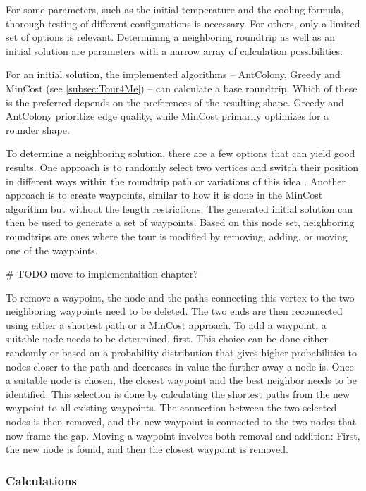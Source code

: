 For some parameters, such as the initial temperature and the cooling formula, thorough testing of different configurations is necessary.
For others, only a limited set of options is relevant.
Determining a neighboring roundtrip as well as an initial solution are parameters with a narrow array of calculation possibilities:

For an initial solution, the implemented algorithms -- AntColony, Greedy and MinCost (see \ref{subsec:Tour4Me}) -- can calculate a base roundtrip.
Which of these is the preferred depends on the preferences of the resulting shape. 
Greedy and AntColony prioritize edge quality, while MinCost primarily optimizes for a rounder shape.

To determine a neighboring solution, there are a few options that can yield good results.
One approach is to randomly select two vertices and switch their position in different ways within the roundtrip path or variations of this idea \cite{zhan_list-based_2016}. 
Another approach is to create waypoints, similar to how it is done in the MinCost algorithm but without the length restrictions.
The generated initial solution can then be used to generate a set of waypoints. 
Based on this node set, neighboring roundtrips are ones where the tour is modified by removing, adding, or moving one of the waypoints.

\# TODO move to implementaition chapter?

To remove a waypoint, the node and the paths connecting this vertex to the two neighboring waypoints need to be deleted. 
The two ends are then reconnected using either a shortest path or a MinCost approach.
To add a waypoint, a suitable node needs to be determined, first. 
This choice can be done either randomly or based on a probability distribution that gives higher probabilities to nodes closer to the path and decreases in value the further away a node is.
Once a suitable node is chosen, the closest waypoint and the best neighbor needs to be identified.
This selection is done by calculating the shortest paths from the new waypoint to all existing waypoints.
The connection between the two selected nodes is then removed, and the new waypoint is connected to the two nodes that now frame the gap. 
Moving a waypoint involves both removal and addition:
First, the new node is found, and then the closest waypoint is removed.




\subsubsection{Calculations}
\label{subsubsec:SACalculations}

